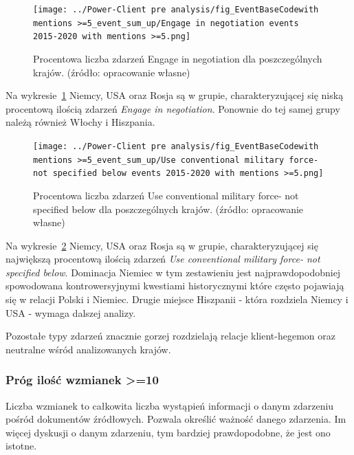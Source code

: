 \documentclass[11pt]{report}
\begin{document}
    \begin{figure}[!htp]
        \centering
        \texttt{[image: ../Power-Client pre analysis/fig\_EventBaseCodewith mentions >=5\_event\_sum\_up/Engage in negotiation events 2015-2020 with mentions >=5.png]}
        \caption{Procentowa liczba zdarzeń Engage in negotiation dla poszczególnych krajów. (źródło: opracowanie własne)}
        \label{fig:Power-Client:ERC:Mentions:SumUp:Engage in negotiation}
    \end{figure}
    Na wykresie~\ref{fig:Power-Client:ERC:Mentions:SumUp:Engage in negotiation} Niemcy, USA oraz Rosja są w grupie,
    charakteryzującej się niską procentową ilością zdarzeń \textit{Engage in negotiation}.
    Ponownie do tej samej grupy należą również Włochy i Hiszpania.

    \begin{figure}[!htp]
        \centering
        \texttt{[image: ../Power-Client pre analysis/fig\_EventBaseCodewith mentions >=5\_event\_sum\_up/Use conventional military force- not specified below events 2015-2020 with mentions >=5.png]}
        \caption{Procentowa liczba zdarzeń Use conventional military force- not specified below dla poszczególnych krajów. (źródło: opracowanie własne)}
        \label{fig:Power-Client:ERC:Goldstein:SumUp:Use conventional military force- not specified below}
    \end{figure}
    Na wykresie~\ref{fig:Power-Client:ERC:Goldstein:SumUp:Use conventional military force- not specified below} Niemcy, USA oraz Rosja są w grupie,
    charakteryzującej się największą procentową ilością zdarzeń \textit{Use conventional military force- not specified below}.
    Dominacja Niemiec w tym zestawieniu jest najprawdopodobniej spowodowana kontrowersyjnymi kwestiami historycznymi
    które często pojawiają się w relacji Polski i Niemiec.
    Drugie miejsce Hiszpanii - która rozdziela Niemcy i USA - wymaga dalszej analizy.

    Pozostałe typy zdarzeń znacznie gorzej rozdzielają relacje klient-hegemon oraz neutralne wśród analizowanych krajów.

    \subsubsection{Próg ilość wzmianek >=10}
    Liczba wzmianek to całkowita liczba wystąpień informacji o danym zdarzeniu pośród dokumentów źródłowych.
    Pozwala określić ważność danego zdarzenia.
    Im więcej dyskusji o danym zdarzeniu, tym bardziej prawdopodobne, że jest ono istotne.
\end{document}

